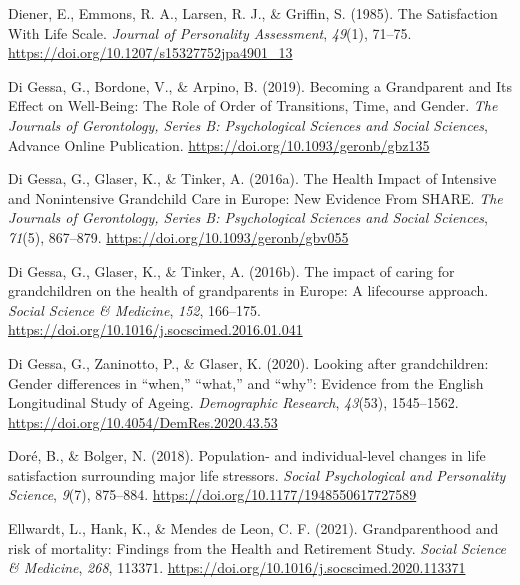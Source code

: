 \documentclass[
  english,
  man, noextraspace]{apa7}
\begin{document}
\leavevmode\hypertarget{ref-dienerSatisfactionLifeScale1985}{}%
Diener, E., Emmons, R. A., Larsen, R. J., \& Griffin, S. (1985). The Satisfaction With Life Scale. \emph{Journal of Personality Assessment}, \emph{49}(1), 71--75. \url{https://doi.org/10.1207/s15327752jpa4901_13}

\leavevmode\hypertarget{ref-digessaBecomingGrandparentIts2019}{}%
Di Gessa, G., Bordone, V., \& Arpino, B. (2019). Becoming a Grandparent and Its Effect on Well-Being: The Role of Order of Transitions, Time, and Gender. \emph{The Journals of Gerontology, Series B: Psychological Sciences and Social Sciences}, Advance Online Publication. \url{https://doi.org/10.1093/geronb/gbz135}

\leavevmode\hypertarget{ref-digessaHealthImpactIntensive2016}{}%
Di Gessa, G., Glaser, K., \& Tinker, A. (2016a). The Health Impact of Intensive and Nonintensive Grandchild Care in Europe: New Evidence From SHARE. \emph{The Journals of Gerontology, Series B: Psychological Sciences and Social Sciences}, \emph{71}(5), 867--879. \url{https://doi.org/10.1093/geronb/gbv055}

\leavevmode\hypertarget{ref-digessaImpactCaringGrandchildren2016}{}%
Di Gessa, G., Glaser, K., \& Tinker, A. (2016b). The impact of caring for grandchildren on the health of grandparents in Europe: A lifecourse approach. \emph{Social Science \& Medicine}, \emph{152}, 166--175. \url{https://doi.org/10.1016/j.socscimed.2016.01.041}

\leavevmode\hypertarget{ref-digessaLookingGrandchildrenGender2020}{}%
Di Gessa, G., Zaninotto, P., \& Glaser, K. (2020). Looking after grandchildren: Gender differences in ``when,'' ``what,'' and ``why'': Evidence from the English Longitudinal Study of Ageing. \emph{Demographic Research}, \emph{43}(53), 1545--1562. \url{https://doi.org/10.4054/DemRes.2020.43.53}

\leavevmode\hypertarget{ref-dorePopulationIndividuallevelChanges2018}{}%
Doré, B., \& Bolger, N. (2018). Population- and individual-level changes in life satisfaction surrounding major life stressors. \emph{Social Psychological and Personality Science}, \emph{9}(7), 875--884. \url{https://doi.org/10.1177/1948550617727589}

\leavevmode\hypertarget{ref-ellwardtGrandparenthoodRiskMortality2021}{}%
Ellwardt, L., Hank, K., \& Mendes de Leon, C. F. (2021). Grandparenthood and risk of mortality: Findings from the Health and Retirement Study. \emph{Social Science \& Medicine}, \emph{268}, 113371. \url{https://doi.org/10.1016/j.socscimed.2020.113371}
\end{document}
